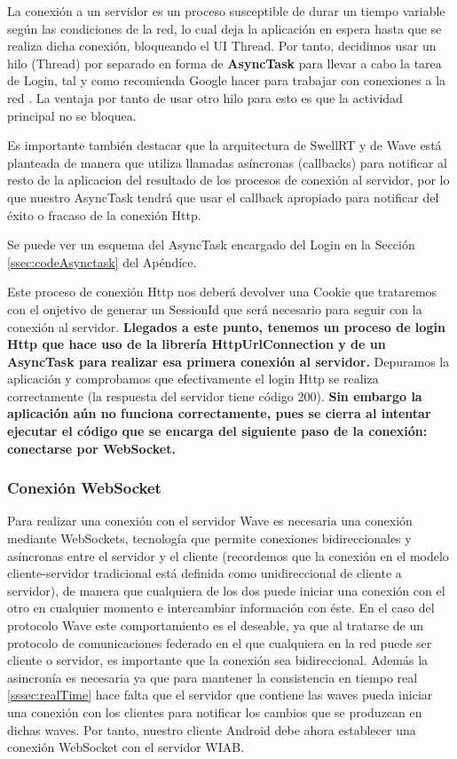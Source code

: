 	  La conexión a un servidor es un proceso susceptible de durar un tiempo variable según las condiciones de la red, lo cual deja la aplicación en espera hasta que se realiza dicha conexión,  bloqueando el UI Thread. Por tanto, decidimos usar un hilo (Thread) por separado en forma de \textbf{AsyncTask} \cite{ref:android_asynctask} para llevar a cabo la tarea de Login, tal y como recomienda Google hacer para trabajar con conexiones a la red \cite{ref:android_networking}. La ventaja por tanto de usar otro hilo para esto es que la actividad principal no se bloquea.
	  	 
	  Es importante también destacar que la arquitectura de SwellRT y de Wave está planteada de manera que utiliza llamadas asíncronas (callbacks) para notificar al resto de la aplicacion del resultado de los procesos de conexión al servidor, por lo que nuestro AsyncTask tendrá que usar el callback apropiado para notificar del éxito o fracaso de la conexión Http.
	 
	  Se puede ver un esquema del AsyncTask encargado del Login en la Sección \ref{ssec:codeAsynctask} del Apéndíce.
	    
	  Este proceso de conexión Http nos deberá devolver una Cookie que trataremos con el onjetivo de generar un SessionId que será necesario para seguir con la conexión al servidor. \textbf{Llegados a este punto, tenemos un proceso de login Http que hace uso de la librería HttpUrlConnection y de un AsyncTask para realizar esa primera conexión al servidor.} Depuramos la aplicación y comprobamos que efectivamente el login Http se realiza correctamente (la respuesta del servidor tiene código 200). \textbf{Sin embargo la aplicación aún no funciona correctamente, pues se cierra al intentar ejecutar el código que se encarga del siguiente paso de la conexión: conectarse por WebSocket.}    
    
    		\subsubsection{Conexión WebSocket}\label{sssec:conWave}
    
    Para realizar una conexión con el servidor Wave es necesaria una conexión mediante WebSockets\cite{ref:webSocket_ref}, tecnología que permite conexiones bidireccionales y asíncronas entre el servidor y el cliente (recordemos que la conexión en el modelo cliente-servidor tradicional está definida como unidireccional de cliente a servidor), de manera que cualquiera de los dos puede iniciar una conexión con el otro en cualquier momento e intercambiar información con éste. En el caso del protocolo Wave este comportamiento es el deseable, ya que al tratarse de un protocolo de comunicaciones federado en el que cualquiera en la red puede ser cliente o servidor, es importante que la conexión sea bidireccional. Además la asincronía es necesaria ya que para mantener la consistencia en tiempo real \ref{sssec:realTime} hace falta que el servidor que contiene las waves pueda iniciar una conexión con los clientes para notificar los cambios que se produzcan en dichas waves. Por tanto, nuestro cliente Android debe ahora establecer una conexión WebSocket con el servidor WIAB. 
    
